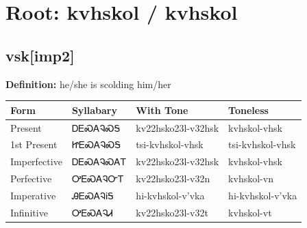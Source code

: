\documentclass{article}%
\begin{document}
%
\normalsize%
\section*{Root: kvhskol / kvhskol}%
\subsection*{vsk[imp2]}%
\textbf{Definition: }%
he/she is scolding him/her%
\\[0.5em]%
\begin{tabular}{|l|l|l|l|}%
\hline%
\textbf{Form}&\textbf{Syllabary}&\textbf{With Tone}&\textbf{Toneless}\\%
\hline%
Present&ᎠᎬᏍᎪᎸᏍᎦ&kv22hsko23l{-}v32hsk&kvhskol{-}vhsk\\%
1st Present&ᏥᎬᏍᎪᎸᏍᎦ&tsi{-}kvhskol{-}vhsk&tsi{-}kvhskol{-}vhsk\\%
Imperfective&ᎠᎬᏍᎪᎸᏍᎪᎢ&kv22hsko23l{-}v32hsk&kvhskol{-}vhsk\\%
Perfective&ᎤᎬᏍᎪᎸᏅᎢ&kv22hsko23l{-}v32n&kvhskol{-}vn\\%
Imperative&ᎯᎬᏍᎪᎸᎥᎦ&hi{-}kvhskol{-}v'vka&hi{-}kvhskol{-}v'vka\\%
Infinitive&ᎤᎬᏍᎪᎸᏗ&kv22hsko23l{-}v32t&kvhskol{-}vt\\%
\hline%
\end{tabular}%
\\[1em]%
\end{document}
